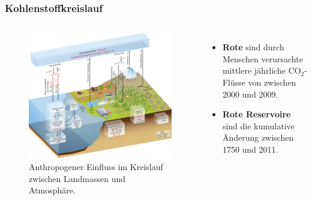 \begin{frame}
	\frametitle{Kohlenstoffkreislauf}
	\begin{columns}
		\begin{figure}
			\centering
			\includegraphics[width=0.9\linewidth]{bilder/kohlenstoff/cycle_antropogenic-ocean-and-atmosphere.png}
			\caption{Anthropogener Einfluss im Kreislauf zwischen Landmassen und Atmosphäre.}
		\end{figure}
		\begin{itemize}
			\item \color{red}\textbf{Rote \rightarrow} \color{black} sind durch Menschen verursachte mittlere jährliche CO$_2$-Flüsse von zwischen 2000 und 2009.
			\item \color{red}\textbf{Rote Reservoire} \color{black} sind die kumulative Änderung zwischen 1750 und 2011.
		\end{itemize}
	\end{columns}
\end{frame}

